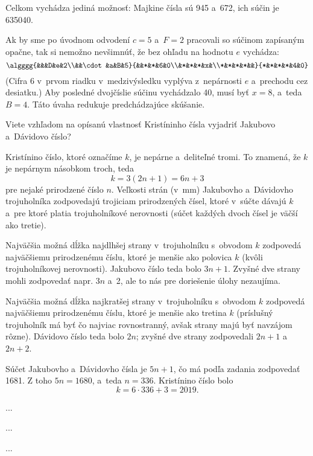 {\noindent
Celkom vychádza jediná možnosť:
Majkine čísla sú 945 a~672, ich súčin je 635040.

\poznamka
Ak by sme po úvodnom odvodení $c=5$ a~$F=2$ pracovali so súčinom zapísaným opačne, tak si nemožno nevšimnúť, že bez ohľadu na hodnotu $e$ vychádza:
$$
\algggg{&&&D&e&2\\&&\cdot&a&B&5}{&&*&*&6&0\\&*&*&*&x&\\*&*&*&*&&}{*&*&*&*&4&0}
$$
(Cifra 6 v~prvom riadku v~medzivýsledku vyplýva z~nepárnosti $e$ a~prechodu cez desiatku.)
Aby posledné dvojčíslie súčinu vychádzalo 40, musí byť $x=8$, a~teda $B=4$.
Táto úvaha redukuje predchádzajúce skúšanie.
}

{%
\napad
Viete vzhľadom na opísanú vlastnosť Kristíninho čísla vyjadriť Jakubovo a~Dávidovo číslo?

\riesenie
Kristínino číslo, ktoré označíme $k$, je nepárne a~deliteľné tromi.
To znamená, že $k$ je nepárnym násobkom troch, teda
$$
k=3(2n+1)=6n+3
$$
pre nejaké prirodzené číslo $n$.
Veľkosti strán (v~mm) Jakubovho a~Dávidovho trojuholníka zodpovedajú trojiciam prirodzených čísel, ktoré v~súčte dávajú $k$ a~pre ktoré platia trojuholníkové nerovnosti (súčet každých dvoch čísel je väčší ako tretie).

Najväčšia možná dĺžka najdlhšej strany v~trojuholníku s~obvodom $k$ zodpovedá najväčšiemu prirodzenému číslu, ktoré je menšie ako polovica $k$ (kvôli trojuholníkovej nerovnosti).
Jakubovo číslo teda bolo $3n+1$.
Zvyšné dve strany mohli zodpovedať napr. $3n$ a~2, ale to nás pre doriešenie úlohy nezaujíma.

Najväčšia možná dĺžka najkratšej strany v~trojuholníku s~obvodom $k$ zodpovedá najväčšiemu prirodzenému číslu, ktoré je menšie ako tretina $k$ (príslušný trojuholník má byť čo najviac {rovnostranný}, avšak strany majú byť navzájom rôzne).
Dávidovo číslo teda bolo $2n$; zvyšné dve strany zodpovedali $2n+1$ a~$2n+2$.

Súčet Jakubovho a~Dávidovho čísla je $5n+1$, čo má podľa zadania zodpovedať 1681.
Z toho $5n=1680$, a~teda $n=336$.
Kristínino číslo bolo
$$
k=6\cdot336+3=2019.
$$
}

{%
...}

{%
...}

{%
...}


